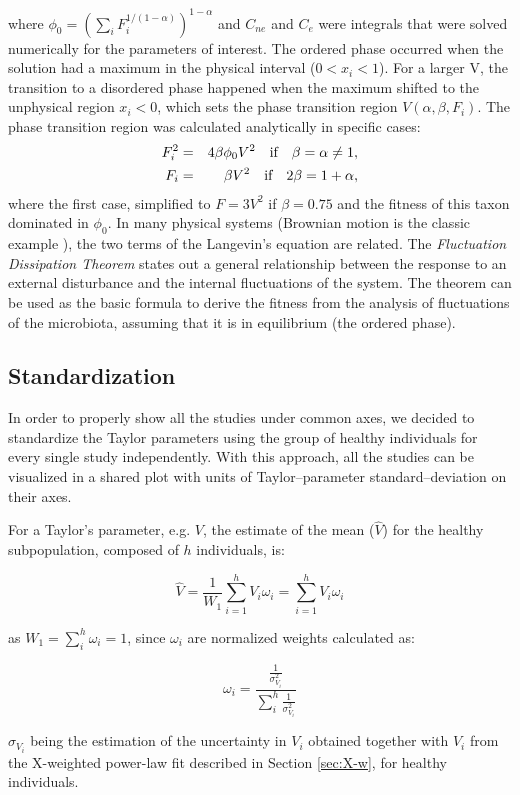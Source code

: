 where $\phi_0 = (\sum_i F_i^{1/(1-\alpha)})^{1-\alpha}$ and $C_{ne}$ and $C_{e}$ were integrals that were solved numerically for the parameters of interest. The ordered phase occurred when the solution had a maximum in the physical interval ($0<x_i<1$). For a larger V, the transition to a disordered phase happened when the maximum shifted to the unphysical region $x_i<0$, which sets the phase transition region $V(\alpha,\beta,F_i)$. The phase transition region was calculated analytically in specific cases:
\begin{eqnarray*}
F_i^2 &=& 4 \beta \phi_0 V^2\quad \textrm{if} \quad  \beta = \alpha \neq 1,\\
F_i &=& \beta V^2\quad \textrm{if} \quad  2\beta = 1+\alpha,
\notag
\end{eqnarray*}
where the first case, simplified to $F = 3 V^2$ if $\beta = 0.75$ and the fitness of this taxon dominated in $\phi_0$. 
In many physical systems (Brownian motion is the classic example \cite{Einstein}), the two terms of the Langevin's equation are related.  The \emph{Fluctuation Dissipation Theorem} states out a general relationship between the response to an external disturbance and the internal fluctuations of the system\cite{FD}. The theorem can be used as the basic formula to derive the fitness from the analysis of fluctuations 
of the microbiota, assuming that it is in equilibrium (the ordered phase).  

\subsection*{Standardization} \label{sec:stan}
In order to properly show all the studies under common axes, we decided to standardize the Taylor parameters using the group of healthy individuals for every single study independently. With this approach, all the studies can be visualized in a shared plot with units of Taylor--parameter standard--deviation on their axes.

For a Taylor's parameter, e.g. $V$, the estimate of the mean ($\widehat{V}$) for the healthy subpopulation, composed of $h$ individuals, is:
\begin{linenomath}
$$\widehat{V} = \frac{1}{W_1}\sum_{i=1}^h V_i \omega_i=\sum_{i=1}^h V_i \omega_i$$
\end{linenomath}
as $W_1=\sum_i^h \omega_i=1$, since $\omega_i$ are normalized weights calculated as:
\begin{linenomath}
$$\omega_i = \frac{\frac{1}{\sigma^2_{V_i}}}{\sum_i^h\frac{1}{\sigma^2_{V_i}}}$$
\end{linenomath}
$\sigma_{V_i}$ being the estimation of the uncertainty in $V_i$ obtained together with $V_i$ from the X-weighted power-law fit described in Section \ref{sec:X-w}, for healthy individuals.

